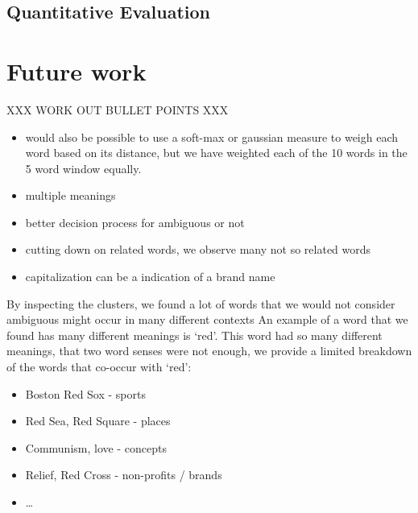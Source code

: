\documentclass[11pt]{article}
\begin{document}


\subsection{Quantitative Evaluation}
\section{Future work}
XXX WORK OUT BULLET POINTS XXX
\begin{itemize}
\item would also be possible to use a soft-max or gaussian measure to weigh each word based on its distance, but we have weighted each of the 10 words in the 5 word window equally.
\item multiple meanings
\item better decision process for ambiguous or not
\item cutting down on related words, we observe many not so related words
\item capitalization can be a indication of a brand name
\end{itemize}

By inspecting the clusters, we found a lot of words that we would not consider ambiguous might occur in many different contexts An example of a word that we found has many different meanings is `red'. This word had so many different meanings, that two word senses were not enough, we provide a limited breakdown of the words that co-occur with `red':

\begin{itemize}
\item Boston Red Sox - sports
\item Red Sea, Red Square - places
\item Communism, love - concepts
\item Relief, Red Cross - non-profits / brands
\item \dots
\end{itemize} 
 
\end{document}
